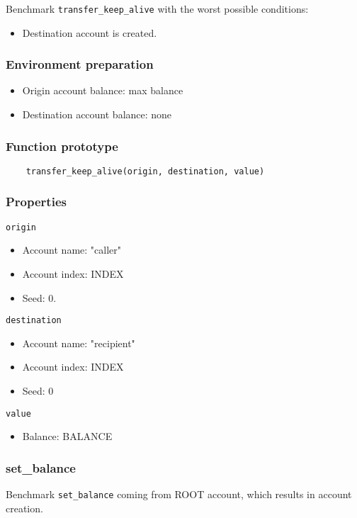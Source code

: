 \documentclass[11pt,a4paper]{article}
\begin{document}
Benchmark \verb|transfer_keep_alive| with the worst possible conditions:
\begin{itemize}
\item Destination account is created.
\end{itemize}

\subsubsection*{Environment preparation}
\begin{itemize}
\item Origin account balance: max balance
\item Destination account balance: none
\end{itemize}

\subsubsection*{Function prototype}
\begin{verbatim}
    transfer_keep_alive(origin, destination, value)
\end{verbatim}

\subsubsection*{Properties}
\verb|origin|
\begin{itemize}
\item Account name: "caller"
\item Account index: INDEX
\item Seed: 0.
\end{itemize}
\verb|destination|
\begin{itemize}
\item Account name: "recipient"
\item Account index: INDEX
\item Seed: 0
\end{itemize}
\verb|value|
\begin{itemize}
\item Balance: BALANCE
\end{itemize}

\subsubsection{set\_balance}

Benchmark \verb|set_balance| coming from ROOT account, which results in account creation.
\end{document}
